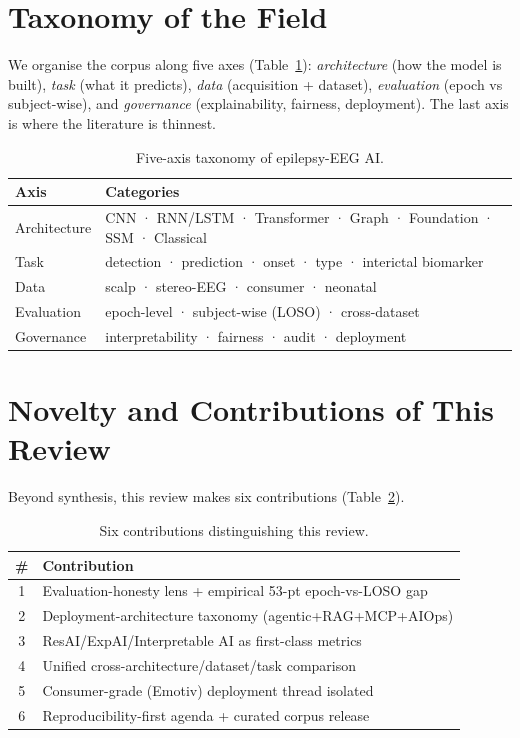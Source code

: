 \documentclass[10pt,journal,twocolumn]{IEEEtran}
\begin{document}
\section{Taxonomy of the Field}
We organise the corpus along five axes (Table~\ref{tab:taxo}): \emph{architecture} (how the model is built), \emph{task} (what it predicts), \emph{data} (acquisition + dataset), \emph{evaluation} (epoch vs subject-wise), and \emph{governance} (explainability, fairness, deployment). The last axis is where the literature is thinnest.
\begin{table}[h]\centering\caption{Five-axis taxonomy of epilepsy-EEG AI.}\label{tab:taxo}
\footnotesize\begin{tabular}{ll}\toprule
Axis & Categories\\\midrule
Architecture & CNN · RNN/LSTM · Transformer · Graph · Foundation · SSM · Classical\\
Task & detection · prediction · onset · type · interictal biomarker\\
Data & scalp · stereo-EEG · consumer · neonatal\\
Evaluation & epoch-level · subject-wise (LOSO) · cross-dataset\\
Governance & interpretability · fairness · audit · deployment\\\bottomrule
\end{tabular}\end{table}

\section{Novelty and Contributions of This Review}
Beyond synthesis, this review makes six contributions (Table~\ref{tab:contrib}).
\begin{table}[h]\centering\caption{Six contributions distinguishing this review.}\label{tab:contrib}
\footnotesize\begin{tabular}{cl}\toprule
\# & Contribution\\\midrule
1 & Evaluation-honesty lens + empirical 53-pt epoch-vs-LOSO gap\\
2 & Deployment-architecture taxonomy (agentic+RAG+MCP+AIOps)\\
3 & ResAI/ExpAI/Interpretable AI as first-class metrics\\
4 & Unified cross-architecture/dataset/task comparison\\
5 & Consumer-grade (Emotiv) deployment thread isolated\\
6 & Reproducibility-first agenda + curated corpus release\\\bottomrule
\end{tabular}\end{table}
\end{document}
